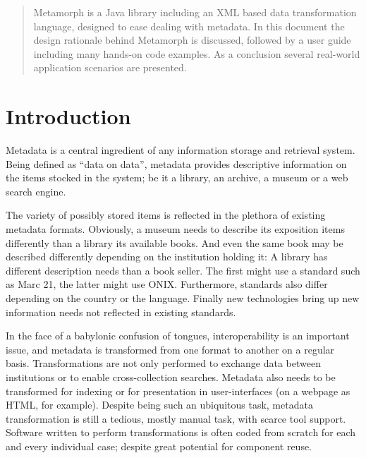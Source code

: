 \documentclass[12pt,a4paper]{article}
\begin{document}
\maketitle

\begin{abstract}
Metamorph is a Java library including an XML based data transformation language, designed to ease dealing with metadata. In this document the design rationale behind Metamorph is discussed, followed by a user guide including many hands-on code examples. As a conclusion several real-world application scenarios are presented.
\end{abstract}

\setcounter{tocdepth}{2}
\tableofcontents

\section{Introduction}
Metadata is a central ingredient of any information storage and retrieval system. Being defined as ``data on data'', metadata provides descriptive information on the items stocked in the system; be it a library, an archive, a museum or a web search engine.

The variety of possibly stored items is reflected in the plethora of existing metadata formats. Obviously, a museum needs to describe its exposition items differently than a library its available books. And even the same book may be described differently depending on the institution holding it: A library has different description needs than a book seller. The first might use a standard such as Marc 21, the latter might use ONIX. Furthermore, standards also differ depending on the country or the language. Finally new technologies bring up new information needs not reflected in existing standards. 

In the face of a babylonic confusion of tongues, interoperability is an important issue, and metadata is transformed from one format to another on a regular basis. Transformations are not only performed to exchange data between institutions or to enable cross-collection searches. Metadata also needs to be transformed for indexing or for presentation in user-interfaces (on a webpage as HTML, for example). Despite being such an ubiquitous task, metadata transformation is still a tedious, mostly manual task, with scarce tool support. Software written to perform transformations is often coded from scratch for each and every individual case; despite great potential for component reuse. 
\end{document}

